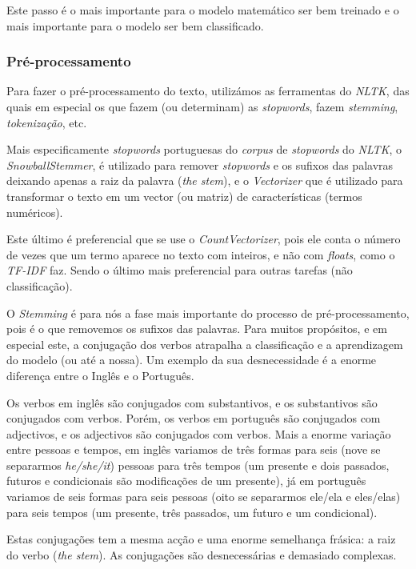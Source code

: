 Este passo é o mais importante para o modelo matemático ser bem treinado e o mais importante para o modelo ser bem classificado.

\subsubsection{Pré-processamento}

Para fazer o pré-processamento do texto, utilizámos as ferramentas do \textit{NLTK}, das quais em especial os que fazem (ou determinam) as \textit{stopwords}, fazem \textit{stemming}, \textit{tokenização}, etc.

Mais especificamente \textit{stopwords} portuguesas do \textit{corpus} de \textit{stopwords} do \textit{NLTK}, o \textit{SnowballStemmer}, é utilizado para remover \textit{stopwords} e os sufixos das palavras deixando apenas a raiz da palavra (\textit{the stem}), e o \textit{Vectorizer} que é utilizado para transformar o texto em um vector (ou matriz) de características (termos numéricos).

Este último é preferencial que se use o \textit{CountVectorizer}, pois ele conta o número de vezes que um termo aparece no texto com inteiros, e não com \textit{floats}, como o \textit{TF-IDF} faz. Sendo o último mais preferencial para outras tarefas (não classificação).

O \textit{Stemming} é para nós a fase mais importante do processo de pré-processamento, pois é o que removemos os sufixos das palavras.
Para muitos propósitos, e em especial este, a conjugação dos verbos atrapalha a classificação e a aprendizagem do modelo (ou até a nossa). Um exemplo da sua desnecessidade é a enorme diferença entre o Inglês e o Português.

Os verbos em inglês são conjugados com substantivos, e os substantivos são conjugados com verbos. Porém, os verbos em português são conjugados com adjectivos, e os adjectivos são conjugados com verbos. Mais a enorme variação entre pessoas e tempos, em inglês variamos de três formas para seis (nove se separarmos \textit{he/she/it}) pessoas para três tempos (um presente e dois passados, futuros e condicionais são modificações de um presente), já em português variamos de seis formas para seis pessoas (oito se separarmos ele/ela e eles/elas) para seis tempos (um presente, três passados, um futuro e um condicional).

Estas conjugações tem a mesma acção e uma enorme semelhança frásica: a raiz do verbo (\textit{the stem}). As conjugações são desnecessárias e demasiado complexas.

